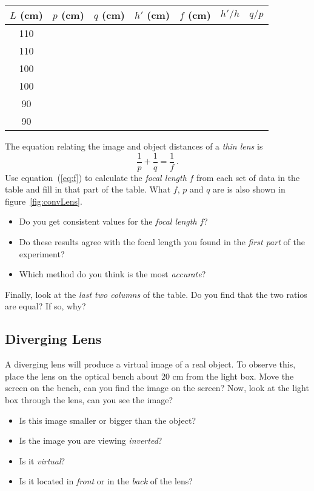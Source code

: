 \documentclass[11pt, a4paper]{article}
\begin{document}
\begin{center}
    \def\arraystretch{1.5}
    \setlength\tabcolsep{0.6cm}
    \begin{tabular}{|c|c|c|c|c|c|c|}
        \hline
        \rowcolor{gray!40}
        $L$ (cm) & $p$ (cm) & $q$ (cm) & $h'$ (cm) & $f$ (cm) & $h'/h$ & $q/p$ \\
        \hline
        110 & ~ & ~ & ~ & ~ & ~ & ~ \\
        \hline
        110 & ~ & ~ & ~ & ~ & ~ & ~ \\
        \hline
        100 & ~ & ~ & ~ & ~ & ~ & ~ \\
        \hline
        100 & ~ & ~ & ~ & ~ & ~ & ~ \\
        \hline
        90 & ~ & ~ & ~ & ~ & ~ & ~ \\
        \hline
        90 & ~ & ~ & ~ & ~ & ~ & ~ \\
        \hline
    \end{tabular}
\end{center}

The equation relating the image and object distances of a \textit{thin lens} is
\begin{equation}
    \frac{1}{p} + \frac{1}{q} = \frac{1}{f}\,.
    \label{eq:f}
\end{equation}
Use equation~(\ref{eq:f}) to calculate the \textit{focal length} $f$ from each set of data in the table
and fill in that part of the table.
What $f$, $p$ and $q$ are is also shown in figure~\ref{fig:convLens}.
\begin{itemize}
    \item Do you get consistent values for the \textit{focal length} $f$?
    \item Do these results agree with the focal length you found in the \textit{first part} of the experiment?
    \item Which method do you think is the most \textit{accurate}?
\end{itemize}
\fillwithlines{3cm}
Finally, look at the \textit{last two columns} of the table.
Do you find that the two ratios are equal?
If so, why?
\fillwithlines{3cm}
\subsection{Diverging Lens}
A diverging lens will produce a virtual image of a real object. 
To observe this, place the lens on the optical bench about 20 cm from the light
box.
Move the screen on the bench, can you find the image on the screen?
Now, look at the light box through the lens, can you see the image?
\begin{itemize}
    \item Is this image smaller or bigger than the object?
    \item Is the image you are viewing \textit{inverted}?
    \item Is it \textit{virtual}?
    \item Is it located in \textit{front} or in the \textit{back} of the lens?
\end{itemize}
\fillwithlines{3cm}
\end{document}
